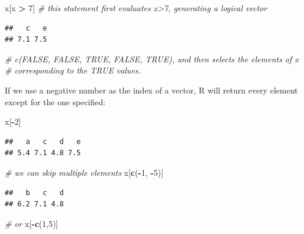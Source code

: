 \documentclass[
]{book}
\newenvironment{Shaded}{\begin{snugshade}}{\end{snugshade}}
\newcommand{\CommentTok}[1]{\textcolor[rgb]{0.56,0.35,0.01}{\textit{#1}}}
\newcommand{\DecValTok}[1]{\textcolor[rgb]{0.00,0.00,0.81}{#1}}
\newcommand{\FunctionTok}[1]{\textcolor[rgb]{0.13,0.29,0.53}{\textbf{#1}}}
\newcommand{\NormalTok}[1]{#1}
\newcommand{\SpecialCharTok}[1]{\textcolor[rgb]{0.81,0.36,0.00}{\textbf{#1}}}
\begin{document}
\begin{Shaded}
\begin{Highlighting}[]
\NormalTok{x[x }\SpecialCharTok{\textgreater{}} \DecValTok{7}\NormalTok{] }\CommentTok{\# this statement first evaluates x\textgreater{}7, generating a logical vector }
\end{Highlighting}
\end{Shaded}

\begin{verbatim}
##   c   e 
## 7.1 7.5
\end{verbatim}

\begin{Shaded}
\begin{Highlighting}[]
\CommentTok{\# c(FALSE, FALSE, TRUE, FALSE, TRUE), and then selects the elements of x }
\CommentTok{\# corresponding to the TRUE values.}
\end{Highlighting}
\end{Shaded}

If we use a negative number as the index of a vector, R will return every element except for the one specified:

\begin{Shaded}
\begin{Highlighting}[]
\NormalTok{x[}\SpecialCharTok{{-}}\DecValTok{2}\NormalTok{]}
\end{Highlighting}
\end{Shaded}

\begin{verbatim}
##   a   c   d   e 
## 5.4 7.1 4.8 7.5
\end{verbatim}

\begin{Shaded}
\begin{Highlighting}[]
\CommentTok{\# we can skip multiple elements}
\NormalTok{x[}\FunctionTok{c}\NormalTok{(}\SpecialCharTok{{-}}\DecValTok{1}\NormalTok{, }\SpecialCharTok{{-}}\DecValTok{5}\NormalTok{)]  }
\end{Highlighting}
\end{Shaded}

\begin{verbatim}
##   b   c   d 
## 6.2 7.1 4.8
\end{verbatim}

\begin{Shaded}
\begin{Highlighting}[]
\CommentTok{\# or }
\NormalTok{x[}\SpecialCharTok{{-}}\FunctionTok{c}\NormalTok{(}\DecValTok{1}\NormalTok{,}\DecValTok{5}\NormalTok{)]}
\end{Highlighting}
\end{Shaded}
\end{document}
